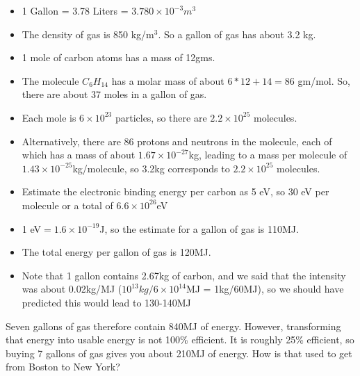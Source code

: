 \documentclass[11pt]{book}
\newcommand\bei{\begin{itemize}}
\newcommand\eei{\end{itemize}}
\begin{document}
\bei
\item 1 Gallon = 3.78 Liters = $3.780\times 10^{-3} m^3$
\item
The density of gas is  850 kg/m$^3$. So a gallon of gas has about 3.2 kg. 
\item 1 mole of carbon atoms has a mass of 12gms.
\item The molecule $C_6H_{14}$ has a molar mass of about $6*12+14=86$ gm/mol. So, there are about 37 moles in a gallon of gas. 
\item Each mole is $6\times 10^{23}$ particles, so there are $2.2\times 10^{25}$ molecules. 
\item Alternatively, there are 86 protons and neutrons in the molecule, each of which has a mass of about $1.67\times 10^{-27}$kg, leading to a mass per molecule of $1.43\times 10^{-25}$kg/molecule, so 3.2kg corresponds to $2.2\times 10^{25}$ molecules.
\item Estimate the electronic binding energy per carbon as 5 eV, so 30 eV per molecule or a total of $6.6\times 10^{26}$eV 
\item 1 eV$=1.6\times 10^{-19}$J, so the estimate for a gallon of gas is 110MJ.
\item The total energy per gallon of gas is 120MJ.
\item Note that 1 gallon contains 2.67kg of carbon, and we said that the intensity was about 0.02kg/MJ ($10^{13}kg/6\times10^{14}$MJ = 1kg/60MJ), so we should have predicted this would lead to 130-140MJ
\eei

Seven gallons of gas therefore contain 840MJ of energy. However, transforming that energy into usable energy is not 100\% efficient. It is roughly 25\% efficient, so buying 7 gallons of gas gives you about 210MJ of energy. How is that used to get from Boston to New York?
\end{document}
